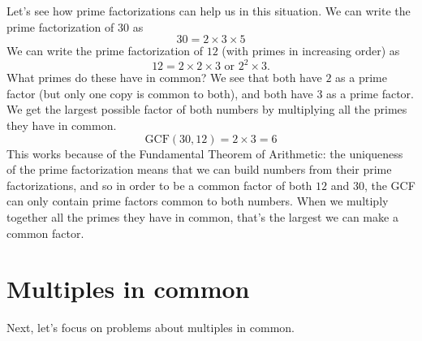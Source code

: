 \documentclass{ximera}
\begin{document}
Let's see how prime factorizations can help us in this situation. We can write the prime factorization of $30$ as
\[
30 = 2 \times 3 \times 5
\]
We can write the prime factorization of $12$ (with primes in increasing order) as
\[
12 = 2 \times 2 \times 3 \textrm{ or } 2^2 \times 3.
\]
What primes do these have in common? We see that both have $2$ as a prime factor (but only one copy is common to both), and both have $3$ as a prime factor. We get the largest possible factor of both numbers by multiplying all the primes they have in common.
\[
\textrm{GCF}(30, 12) = 2 \times 3 = 6
\]
This works because of the Fundamental Theorem of Arithmetic: the uniqueness of the prime factorization means that we can build numbers from their prime factorizations, and so in order to be a common factor of both $12$ and $30$, the GCF can only contain prime factors common to both numbers. When we multiply together all the primes they have in common, that's the largest we can make a common factor. 



\section{Multiples in common}

Next, let's focus on problems about multiples in common.
\end{document}
